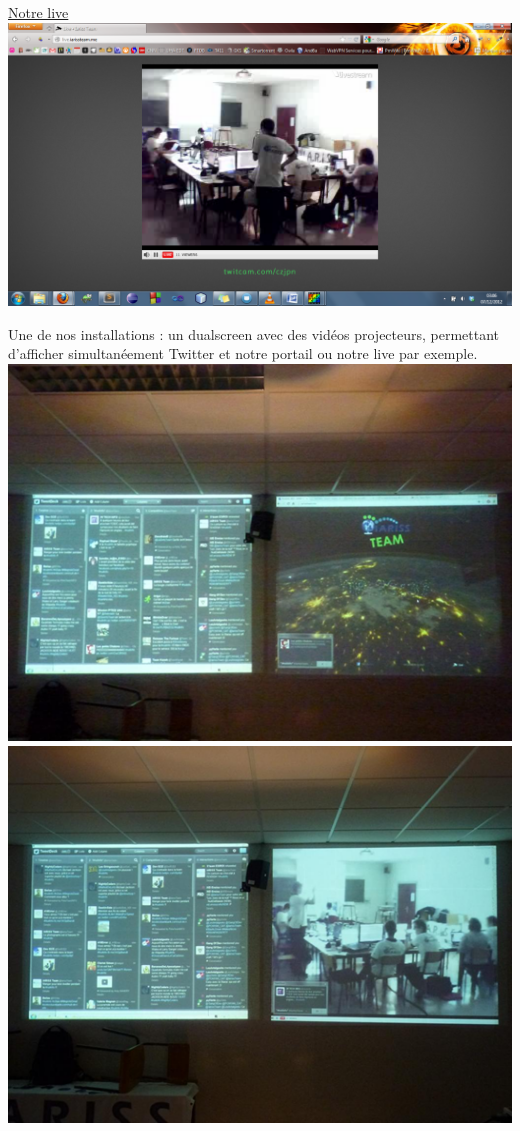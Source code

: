 \documentclass[12pt, a4paper]{article}
\newcommand{\espace}{\vspace{.8cm}}
\begin{document}
\href{http://live.iarissteam.me/}{Notre live}
\espace{}
\includegraphics[width=.9\textwidth, keepaspectratio=true]{img/live.png}
\espace{}

Une de nos installations : un dualscreen avec des vidéos projecteurs, permettant d'afficher simultanéement Twitter et notre portail ou notre live par exemple.
\espace{}
\includegraphics[width=.9\textwidth, keepaspectratio=true]{img/photo1.png}
\espace{}
\includegraphics[width=.9\textwidth, keepaspectratio=true]{img/photo2.png}
\espace{}
\end{document}
